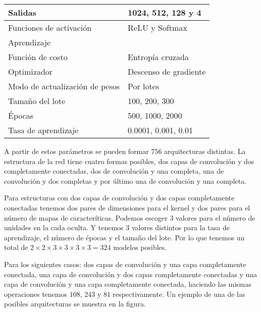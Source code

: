 \begin{table}[]
\begin{tabular}{|l|l|}
Salidas                  & 1024, 512, 128 y 4                                                                                                                               \\ \hline
Funciones de activación  & ReLU y Softmax                                                                                                                              \\ \hline
\multicolumn{2}{|l|}{Aprendizaje}                                                                                                                                      \\ \hline
Función de costo         & Entropía cruzada                                                                                                                            \\ \hline
Optimizador              & Descenso de gradiente                                                                                                                       \\ \hline
Modo de actualización de pesos & Por lotes
\\ \hline
Tamaño del lote & 100, 200, 300
\\ \hline
Épocas & 500, 1000, 2000
\\ \hline
Tasa de aprendizaje & 0.0001, 0.001, 0.01
\\ \hline
\end{tabular}

\end{table}

A partir de estos parámetros se pueden formar $756$ arquitecturas distintas. 
La estructura de la red tiene cuatro formas posibles, dos capas de convolución
y dos completamente conectadas, dos de convolución y una completa, una de convolución
y dos completas y por último una de convolución y una completa. 

Para estructuras con dos capas de convolución y dos capas completamente conectadas 
tenemos dos
pares de dimensiones para el kernel y dos pares para el número de mapas de 
caracteríticas. Podemos escoger $3$ valores para el número de unidades 
en la cada oculta. Y tenemos $3$ valores distintos para la tasa de aprendizaje, 
el número de épocas y el tamaño del lote. Por lo que tenemos un total
de $2 \times 2 \times 3 \times 3 \times 3 \times 3 = 324$ modelos posibles. 

Para los siguientes casos: dos capas de convolución y una capa completamente conectada, una capa de convolución y dos capas completamente conectadas y
una capa de convolución y una capa completamente conectada, haciendo las
mismas operaciones tenemos $108$, $243$ y $81$ respectivamente.
Un ejemplo de una de las posibles arquitecturas se muestra en la figura.

%
